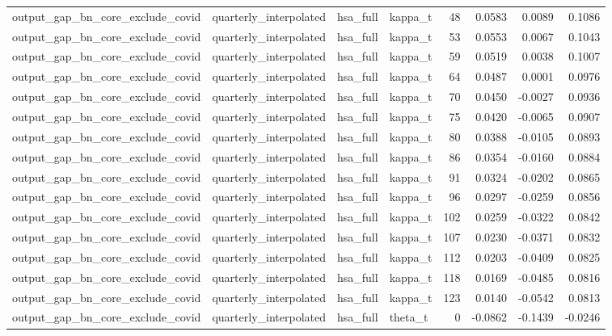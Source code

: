 \begin{tabular}{llllrrrr}
output\_gap\_bn\_core\_exclude\_covid & quarterly\_interpolated & hsa\_full & kappa\_t & 48 & 0.0583 & 0.0089 & 0.1086 \\
output\_gap\_bn\_core\_exclude\_covid & quarterly\_interpolated & hsa\_full & kappa\_t & 53 & 0.0553 & 0.0067 & 0.1043 \\
output\_gap\_bn\_core\_exclude\_covid & quarterly\_interpolated & hsa\_full & kappa\_t & 59 & 0.0519 & 0.0038 & 0.1007 \\
output\_gap\_bn\_core\_exclude\_covid & quarterly\_interpolated & hsa\_full & kappa\_t & 64 & 0.0487 & 0.0001 & 0.0976 \\
output\_gap\_bn\_core\_exclude\_covid & quarterly\_interpolated & hsa\_full & kappa\_t & 70 & 0.0450 & -0.0027 & 0.0936 \\
output\_gap\_bn\_core\_exclude\_covid & quarterly\_interpolated & hsa\_full & kappa\_t & 75 & 0.0420 & -0.0065 & 0.0907 \\
output\_gap\_bn\_core\_exclude\_covid & quarterly\_interpolated & hsa\_full & kappa\_t & 80 & 0.0388 & -0.0105 & 0.0893 \\
output\_gap\_bn\_core\_exclude\_covid & quarterly\_interpolated & hsa\_full & kappa\_t & 86 & 0.0354 & -0.0160 & 0.0884 \\
output\_gap\_bn\_core\_exclude\_covid & quarterly\_interpolated & hsa\_full & kappa\_t & 91 & 0.0324 & -0.0202 & 0.0865 \\
output\_gap\_bn\_core\_exclude\_covid & quarterly\_interpolated & hsa\_full & kappa\_t & 96 & 0.0297 & -0.0259 & 0.0856 \\
output\_gap\_bn\_core\_exclude\_covid & quarterly\_interpolated & hsa\_full & kappa\_t & 102 & 0.0259 & -0.0322 & 0.0842 \\
output\_gap\_bn\_core\_exclude\_covid & quarterly\_interpolated & hsa\_full & kappa\_t & 107 & 0.0230 & -0.0371 & 0.0832 \\
output\_gap\_bn\_core\_exclude\_covid & quarterly\_interpolated & hsa\_full & kappa\_t & 112 & 0.0203 & -0.0409 & 0.0825 \\
output\_gap\_bn\_core\_exclude\_covid & quarterly\_interpolated & hsa\_full & kappa\_t & 118 & 0.0169 & -0.0485 & 0.0816 \\
output\_gap\_bn\_core\_exclude\_covid & quarterly\_interpolated & hsa\_full & kappa\_t & 123 & 0.0140 & -0.0542 & 0.0813 \\
output\_gap\_bn\_core\_exclude\_covid & quarterly\_interpolated & hsa\_full & theta\_t & 0 & -0.0862 & -0.1439 & -0.0246 \\

\end{tabular}
